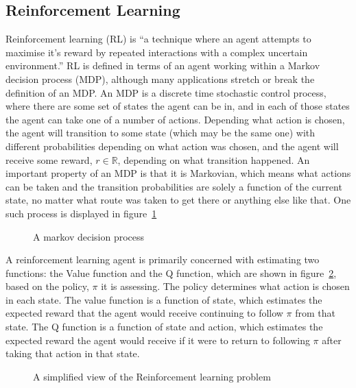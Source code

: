 \subsection{Reinforcement Learning}
Reinforcement learning (RL) is ``a technique where an agent attempts to maximise it's reward by repeated interactions with a complex uncertain environment.'' \cite{Sutton:1998:IRL:551283}
RL is defined in terms of an agent working within a Markov decision process (MDP), although many applications stretch or break the definition of an MDP. An MDP is a discrete time stochastic control process, where there are some set of states the agent can be in, and in each of those states the agent can take one of a number of actions. Depending what action is chosen, the agent will transition to some state (which may be the same one) with different probabilities depending on what action was chosen, and the agent will receive some reward, $r \in \mathbb{R}$, depending on what transition happened. An important property of an MDP is that it is Markovian, which means what actions can be taken and the transition probabilities are solely a function of the current state, no matter what route was taken to get there or anything else like that. One such process is displayed in figure~\ref{fig:mdpsimple}

\begin{figure}
\centering

\caption{A markov decision process}
\label{fig:mdpsimple}
\end{figure}

A reinforcement learning agent is primarily concerned with estimating two functions: the Value function and the Q function, which are shown in figure~\ref{fig:rlsimple}, based on the policy, $\pi$ it is assessing. The policy determines what action is chosen in each state. The value function is a function of state, which estimates the expected reward that the agent would receive continuing to follow $\pi$ from that state. The Q function is a function of state and action, which estimates  the expected reward the agent would receive if it were to return to following $\pi$ after taking that action in that state.

\begin{figure}
\centering

\caption{A simplified view of the Reinforcement learning problem}
\label{fig:rlsimple}
\end{figure}

